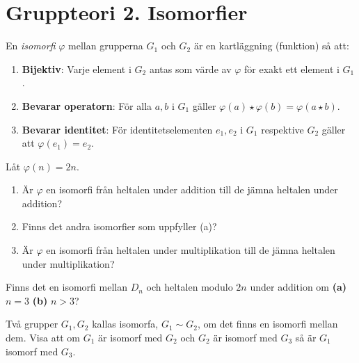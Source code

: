\documentclass[11pt,fleqn]{book} %
\begin{document}
  \renewcommand*\rmdefault{ppl}\normalfont\upshape

\chapter{Gruppteori 2. Isomorfier}
\large
\thispagestyle{empty}



\begin{definition} En \textit{isomorfi} \(\varphi \) mellan grupperna \(G_1\) och \(G_2\) är en kartläggning (funktion) så att:
  \begin{enumerate} %
    \item \textbf{Bijektiv}: Varje element i \(G_2\) antas som värde av \(\varphi\) för exakt ett element i \(G_1\).
    \item \textbf{Bevarar operatorn}: För alla \(a, b\) i \(G_1\) gäller \(\varphi(a) \star \varphi (b) = \varphi(a  \star b)\).
    \item \textbf{Bevarar identitet}: För identitetselementen \(e_1, e_2\) i \(G_1\) respektive \(G_2\) gäller att \(\varphi(e_1) = e_2\).
  \end{enumerate}
\end{definition}

\begin{problem}
  Låt \(\varphi (n) = 2n\).
  \begin{enumerate}[label=\textbf{\alph*)} ]
    \item Är \(\varphi\) en isomorfi från heltalen under addition till de jämna heltalen under addition?
    \item Finns det andra isomorfier som uppfyller (a)? 
    \item Är \(\varphi\) en isomorfi från heltalen under multiplikation till de jämna heltalen under multiplikation?
  \end{enumerate}
\end{problem}

\begin{problem}
  Finns det en isomorfi mellan \(D_n\) och heltalen modulo \(2n\) under addition om \textbf{(a) \(n = 3\) } \textbf{(b)} \(n > 3\)?
\end{problem}

\begin{problem}
  Två grupper \(G_1, G_2\) kallas isomorfa, \(G_1 \sim G_2\),  om det finns en isomorfi mellan dem. Visa att om \(G_1\) är isomorf med \(G_2\) och \(G_2\) är isomorf med \(G_3\) så är \(G_1\) isomorf med \(G_3\).
\end{problem}
\end{document}
